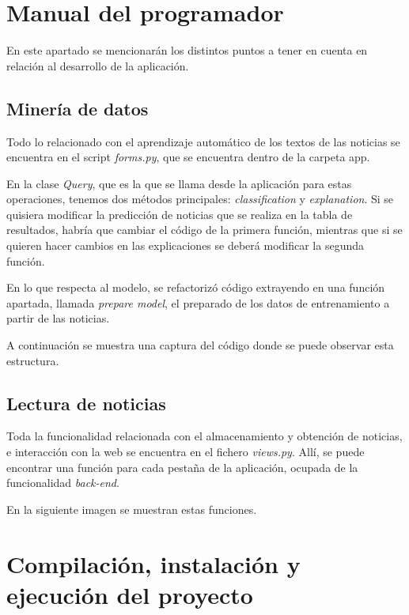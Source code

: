 \section{Manual del programador}

En este apartado se mencionarán los distintos puntos a tener en cuenta en relación al desarrollo de la aplicación.

\subsection{Minería de datos}

Todo lo relacionado con el aprendizaje automático de los textos de las noticias se encuentra en el script \emph{forms.py}, que se encuentra dentro de la carpeta app. 

En la clase \emph{Query}, que es la que se llama desde la aplicación para estas operaciones, tenemos dos métodos principales: \emph{classification} y \emph{explanation}. Si se quisiera modificar la predicción de noticias que se realiza en la tabla de resultados, habría que cambiar el código de la primera función, mientras que si se quieren hacer cambios en las explicaciones se deberá modificar la segunda función.

En lo que respecta al modelo, se refactorizó código extrayendo en una función apartada, llamada \emph{prepare model}, el preparado de los datos de entrenamiento a partir de las noticias.

A continuación se muestra una captura del código donde se puede observar esta estructura.


\subsection{Lectura de noticias}

Toda la funcionalidad relacionada con el almacenamiento y obtención de noticias, e interacción con la web se encuentra en el fichero \emph{views.py}. Allí, se puede encontrar una función para cada pestaña de la aplicación, ocupada de la funcionalidad \emph{back-end}. 

En la siguiente imagen se muestran estas funciones.


\section{Compilación, instalación y ejecución del proyecto}

